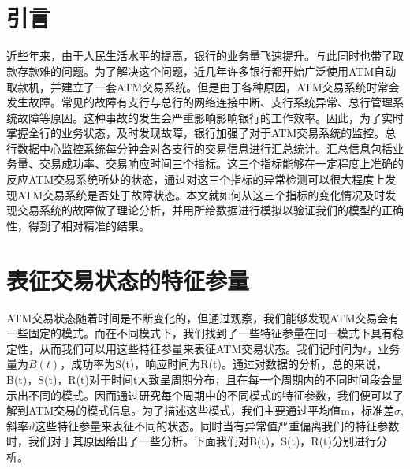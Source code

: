 \documentclass[a4paper]{article}
\begin{document}
\begin{titlepage}



\end{titlepage}

\begin{Huge}
\end{Huge}
\begin{large}
	\begin{flushright}
		
	\end{flushright}
\end{large}
\ \ \\\\

\begin{abstract}
\textit{}
\end{abstract}

\newpage

\tableofcontents

\newpage

\section{引言}
\indent 近些年来，由于人民生活水平的提高，银行的业务量飞速提升。与此同时也带了取款存款难的问题。为了解决这个问题，近几年许多银行都开始广泛使用ATM自动取款机，并建立了一套ATM交易系统。但是由于各种原因，ATM交易系统时常会发生故障。常见的故障有支行与总行的网络连接中断、支行系统异常、总行管理系统故障等原因。这种事故的发生会严重影响影响银行的工作效率。因此，为了实时掌握全行的业务状态，及时发现故障，银行加强了对于ATM交易系统的监控。总行数据中心监控系统每分钟会对各支行的交易信息进行汇总统计。汇总信息包括业务量、交易成功率、交易响应时间三个指标。这三个指标能够在一定程度上准确的反应ATM交易系统所处的状态，通过对这三个指标的异常检测可以很大程度上发现ATM交易系统是否处于故障状态。本文就如何从这三个指标的变化情况及时发现交易系统的故障做了理论分析，并用所给数据进行模拟以验证我们的模型的正确性，得到了相对精准的结果。

\section{表征交易状态的特征参量}
\indent ATM交易状态随着时间是不断变化的，但通过观察，我们能够发现ATM交易会有一些固定的模式。而在不同模式下，我们找到了一些特征参量在同一模式下具有稳定性，从而我们可以用这些特征参量来表征ATM交易状态。我们记时间为$t$，业务量为$B(t)$，成功率为S(t)，响应时间为R(t)。通过对数据的分析，总的来说，B(t)，S(t)，R(t)对于时间t大致呈周期分布，且在每一个周期内的不同时间段会显示出不同的模式。因而通过研究每个周期中的不同模式的特征参数，我们便可以了解到ATM交易的模式信息。为了描述这些模式，我们主要通过平均值m，标准差$\sigma$,斜率$\vartheta$这些特征参量来表征不同的状态。同时当有异常值严重偏离我们的特征参数时，我们对于其原因给出了一些分析。下面我们对B(t)，S(t)，R(t)分别进行分析。
\end{document}
